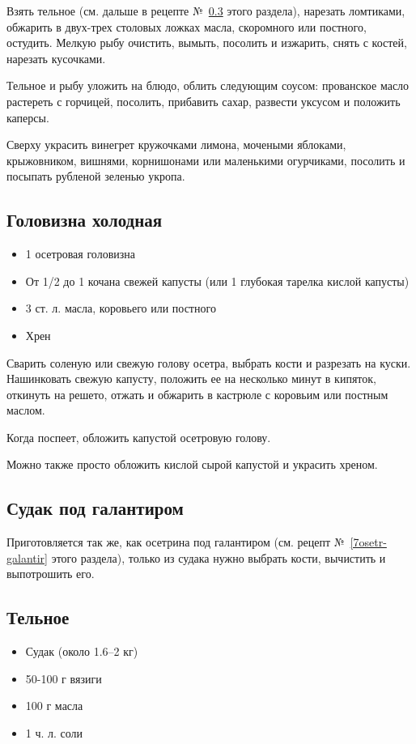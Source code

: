 Взять тельное (см. дальше в рецепте №~\ref{6telnoje} этого раздела), нарезать ломтиками, обжарить в двух-трех столовых ложках масла, скоромного или постного, остудить. Мелкую рыбу очистить, вымыть, посолить и изжарить, снять с костей, нарезать кусочками.

Тельное и рыбу уложить на блюдо, облить следующим соусом: прованское масло растереть с горчицей, посолить, прибавить сахар, развести уксусом и положить каперсы.

Сверху украсить винегрет кружочками лимона, мочеными яблоками, крыжовником, вишнями, корнишонами или маленькими огурчиками, посолить и посыпать рубленой зеленью укропа.

\subsection{Головизна холодная}

\begin{itemize}
	\item 1 осетровая головизна
    \item От 1/2 до 1 кочана свежей капусты (или 1 глубокая тарелка кислой капусты)
    \item 3 ст. л. масла, коровьего или постного 
    \item Хрен
\end{itemize}

Сварить соленую или свежую голову осетра, выбрать кости и разрезать на куски. Нашинковать свежую капусту, положить ее на несколько минут в кипяток, откинуть на решето, отжать и обжарить в кастрюле с коровьим или постным маслом.

Когда поспеет, обложить капустой осетровую голову.

Можно также просто обложить кислой сырой капустой и украсить хреном.

\subsection{Судак под галантиром}

Приготовляется так же, как осетрина под галантиром (см. рецепт №~\ref{7osetr-galantir} этого раздела), только из судака нужно выбрать кости, вычистить и выпотрошить его.

\subsection{Тельное}\label{6telnoje}

\begin{itemize}
	\item Судак (около 1.6–2 кг) 
    \item 50-100 г вязиги 
    \item 100 г масла
    \item 1 ч. л. соли
\end{itemize}

